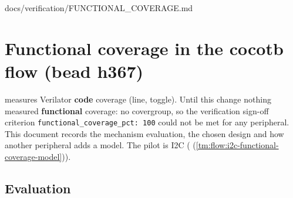 \begin{relocated}{docs/verification/FUNCTIONAL_COVERAGE.md}
\section{Functional coverage in the cocotb flow (bead h367)}\label{tm:flow:functional-coverage}

 measures Verilator \textbf{code}
coverage (line, toggle). Until this change nothing measured
\textbf{functional} coverage: no covergroup, so the verification
sign-off criterion
\texttt{functional\_\allowbreak{}coverage\_\allowbreak{}pct:\allowbreak{}\ 100}
could not be met for any peripheral. This document records the mechanism
evaluation, the chosen design and how another peripheral adds a model.
The pilot is I2C ( (\cref{tm:flow:i2c-functional-coverage-model})).

\subsection{Evaluation}\label{tm:flow:functional-coverage:1-evaluation}

{\footnotesize\setlength{\tabcolsep}{3pt}

}
\end{relocated}
